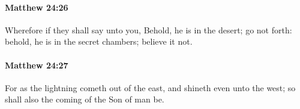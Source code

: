 		\paragraph{Matthew 24:26} %
			\label{MATTHEW-24-26}

			Wherefore if they shall say unto you, Behold, he is in the desert; go not forth: behold, he is in the secret chambers; believe it not.

			\begin{framed}
			\scriptsize
				\begin{compactdesc}
					\item[SBLG] 
				\end{compactdesc}
			\end{framed}

		\paragraph{Matthew 24:27} %
			\label{MATTHEW-24-27}

			For as the lightning cometh out of the east, and shineth even unto the west; so shall also the coming of the Son of man be.

